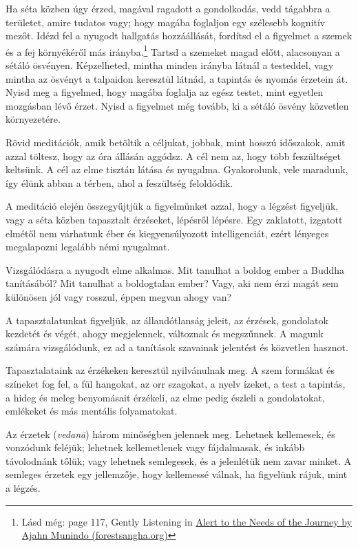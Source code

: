 Ha séta közben úgy érzed, magával ragadott a gondolkodás, vedd tágabbra
a területet, amire tudatos vagy; hogy magába foglaljon egy szélesebb
kognitív mezőt. Idézd fel a nyugodt hallgatás hozzáállását, fordítsd el
a figyelmet a szemek és a fej környékéről más irányba.\footnote{Lásd
  még: page 117, Gently Listening in
  \href{https://forestsangha.org/teachings/books/alert-to-the-needs-of-the-journey?language=English}{Alert
  to the Needs of the Journey by Ajahn Munindo (forestsangha.org)}}
Tartsd a szemeket magad előtt, alacsonyan a sétáló ösvényen.
Képzelheted, mintha minden irányba látnál a testeddel, vagy mintha az
ösvényt a talpaidon keresztül látnád, a tapintás és nyomás érzetein át.
Nyisd meg a figyelmed, hogy magába foglalja az egész testet, mint
egyetlen mozgásban lévő érzet. Nyisd a figyelmet még tovább, ki a sétáló
ösvény közvetlen környezetére.

Rövid meditációk, amik betöltik a céljukat, jobbak, mint hosszú
időszakok, amit azzal töltesz, hogy az óra állásán aggódsz. A cél nem
az, hogy több feszültséget keltsünk. A cél az elme tisztán látása és
nyugalma. Gyakorolunk, vele maradunk, így élünk abban a térben, ahol a
feszültség feloldódik.


A meditáció elején összegyűjtjük a figyelmünket azzal, hogy a légzést
figyeljük, vagy a séta közben tapasztalt érzéseket, lépésről lépésre.
Egy zaklatott, izgatott elmétől nem várhatunk éber és kiegyensúlyozott
intelligenciát, ezért lényeges megalapozni legalább némi nyugalmat.

Vizsgálódásra a nyugodt elme alkalmas. Mit tanulhat a boldog ember a
Buddha tanításából? Mit tanulhat a boldogtalan ember? Vagy, aki nem érzi
magát sem különösen jól vagy rosszul, éppen megvan ahogy van?

A tapasztalatunkat figyeljük, az állandótlanság jeleit, az érzések,
gondolatok kezdetét és végét, ahogy megjelennek, változnak és
megszűnnek. A magunk számára vizsgálódunk, ez ad a tanítások szavainak
jelentést és közvetlen hasznot.

Tapasztalataink az érzékeken keresztül nyilvánulnak meg. A szem formákat
és színeket fog fel, a fül hangokat, az orr szagokat, a nyelv ízeket, a
test a tapintás, a hideg és meleg benyomásait érzékeli, az elme pedig
észleli a gondolatokat, emlékeket és más mentális folyamatokat.


Az érzetek (\emph{vedanā}) három minőségben jelennek meg. Lehetnek
kellemesek, és vonzódunk feléjük; lehetnek kellemetlenek vagy
fájdalmasak, és inkább távolodnánk tőlük; vagy lehetnek semlegesek, és a
jelenlétük nem zavar minket. A semleges érzetek egy jellemzője, hogy
kellemessé válnak, ha figyelünk rájuk, mint a légzés.

